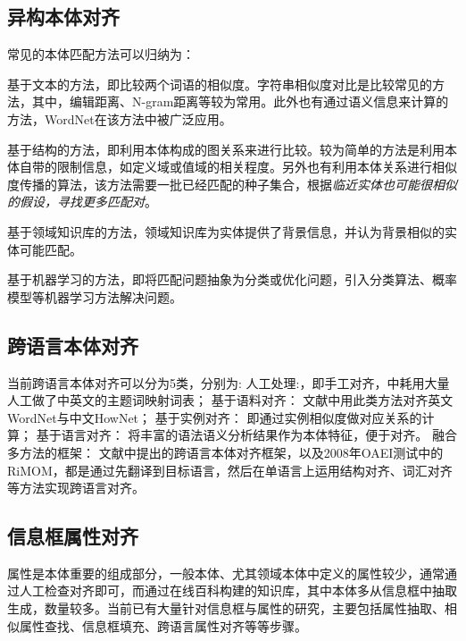 \subsection{异构本体对齐}
常见的本体匹配方法可以归纳为：

{\heiti 基于文本的方法}，即比较两个词语的相似度。字符串相似度对比是比较常见的方法，其中，编辑距离、N-gram距离等较为常用。此外也有通过语义信息来计算的方法，WordNet\cite{miller1995wordnet}在该方法中被广泛应用。

{\heiti 基于结构的方法\cite{hu2008matching}}，即利用本体构成的图关系来进行比较。较为简单的方法是利用本体自带的限制信息，如定义域或值域的相关程度。另外也有利用本体关系进行相似度传播的算法，该方法需要一批已经匹配的种子集合，根据\textit{临近实体也可能很相似的假设，寻找更多匹配对}。

{\heiti 基于领域知识库的方法\cite{ponzetto2009large,gligorov2007using}}，领域知识库为实体提供了背景信息，并认为背景相似的实体可能匹配。

{\heiti 基于机器学习的方法\cite{niepert2010probabilistic,albagli2012markov}}，即将匹配问题抽象为分类或优化问题，引入分类算法、概率模型等机器学习方法解决问题。


\subsection{跨语言本体对齐}
当前跨语言本体对齐可以分为5类\cite{}，分别为:
{\heiti 人工处理:}，即手工对齐，\cite{}中耗用大量人工做了中英文的主题词映射词表；
{\heiti 基于语料对齐：} 文献\cite{}中用此类方法对齐英文WordNet与中文HowNet；
{\heiti 基于实例对齐：} 即通过实例相似度做对应关系的计算\cite{}；
{\heiti 基于语言对齐：} 将丰富的语法语义分析结果作为本体特征，便于对齐。
{\heiti 融合多方法的框架：} 文献\cite{}中提出的跨语言本体对齐框架，以及2008年OAEI测试中的RiMOM\cite{}，都是通过先翻译到目标语言，然后在单语言上运用结构对齐、词汇对齐等方法实现跨语言对齐。

\subsection{信息框属性对齐}
\label{sec:property-research}
属性是本体重要的组成部分，一般本体、尤其领域本体中定义的属性较少，通常通过人工检查对齐即可\cite{wang:movie}，而通过在线百科构建的知识库，其中本体多从信息框中抽取生成，数量较多。当前已有大量针对信息框与属性的研究，主要包括属性抽取、相似属性查找、信息框填充、跨语言属性对齐等等步骤。

